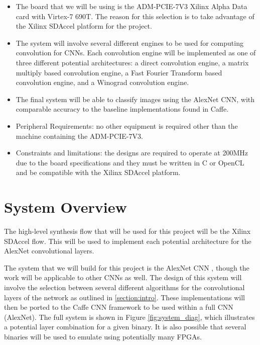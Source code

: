 \documentclass[conference,compsoc]{IEEEtran/IEEEtran}
\begin{document}
\begin{itemize}
\item The board that we will be using is the ADM-PCIE-7V3 Xilinx Alpha Data card
with Virtex-7 690T. The reason for this selection is to take advantage of the
Xilinx SDAccel platform for the project.

\item The system will involve several different engines to be used for computing
convolution for CNNs. Each convolution engine
will be implemented as one of three different potential architectures: a direct
convolution engine, a matrix multiply based convolution engine, a Fast Fourier
Transform based convolution engine, and a Winograd convolution engine. 

\item The final system will be able to classify images using the AlexNet CNN, with
comparable accuracy to the baseline implementations found in Caffe.

\item Peripheral Requirements: no other equipment is required other than the machine
containing the ADM-PCIE-7V3.

\item Constraints and limitations: the designs are required to operate at 200MHz due
to the board specifications and they must be written in C or OpenCL and be compatible
with the Xilinx SDAccel platform.
\end{itemize}

\section{System Overview}\label{section:overview}

The high-level synthesis flow that will be used for this project will be the Xilinx
SDAccel flow. This will be used to implement each potential architecture for the
AlexNet \cite{alexnet} convolutional layers.

The system that we will build for this project is the AlexNet CNN \cite{alexnet}, though the work
will be applicable to other CNNs as well. The design of this system will involve the
selection between several different algorithms for the convolutional layers of the
network as outlined in \ref{section:intro}. These implementations will then be ported
to the Caffe CNN framework to be used within a full CNN (AlexNet). The full system
is shown in Figure \ref{fig:system_diag}, which illustrates a potential layer
combination for a given binary. It is also possible that several binaries will be
used to emulate using potentially many FPGAs.
\end{document}
